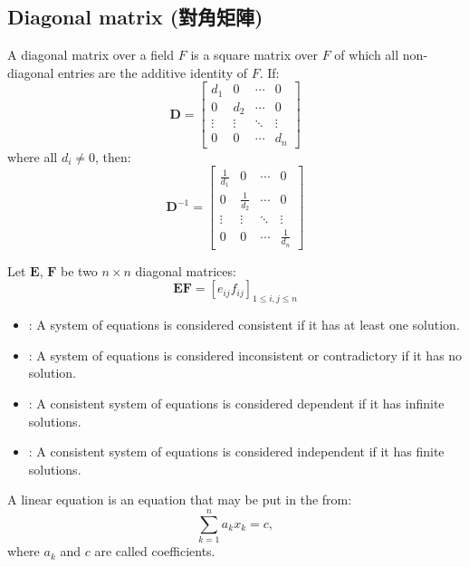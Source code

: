 \documentclass[a4paper,12pt]{report}
\begin{document}
\subsection{Diagonal matrix (對角矩陣)}
A diagonal matrix over a field $F$ is a square matrix over $F$ of which all non-diagonal entries are the additive identity of $F$.
If:
\[\mathbf{D} = \begin{bmatrix}
d_1 & 0 & \cdots & 0 \\
0 & d_2 & \cdots & 0 \\
\vdots & \vdots & \ddots & \vdots \\
0 & 0 & \cdots & d_n
\end{bmatrix}\]
where all $d_i\neq 0$, then:
\[\mathbf{D}^{-1} = \begin{bmatrix}
\frac{1}{d_1} & 0 & \cdots & 0 \\
0 & \frac{1}{d_2} & \cdots & 0 \\
\vdots & \vdots & \ddots & \vdots \\
0 & 0 & \cdots & \frac{1}{d_n}\end{bmatrix}\]

Let $\mathbf{E}$, $\mathbf{F}$ be two $n\times n$ diagonal matrices:
\[\mathbf{E}\mathbf{F}=[e_{ij}f_{ij}]_{1\leq i,j\leq n}\]
\begin{itemize}
\item{}: A system of equations is considered consistent if it has at least one solution.
\item{}: A system of equations is considered inconsistent or contradictory if it has no solution.
\item{}: A consistent system of equations is considered dependent if it has infinite solutions.
\item{}: A consistent system of equations is considered independent if it has finite solutions.
\end{itemize}
A linear equation is an equation that may be put in the from:
\[\sum_{k=1}^na_kx_k=c,\]
where $a_k$ and $c$ are called coefficients.
\end{document}
